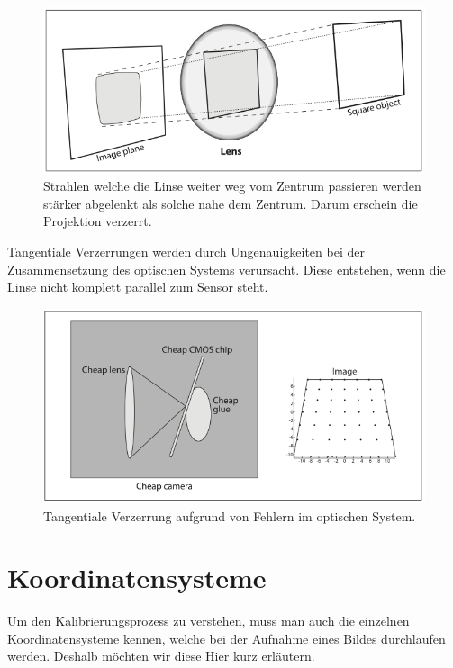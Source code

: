 \begin{figure}[!ht]
\centering
\includegraphics[scale=0.5]{images/radial-disortion.png} 
\caption{Strahlen welche die Linse weiter weg vom Zentrum passieren werden stärker abgelenkt als solche nahe dem Zentrum. Darum erschein die Projektion verzerrt.\protect\cite{learningopencv}}
\label{fig:radial-disortion}
\end{figure}

Tangentiale Verzerrungen werden durch Ungenauigkeiten bei der Zusammensetzung des optischen Systems verursacht. Diese entstehen, wenn die Linse nicht komplett parallel zum Sensor steht.

\begin{figure}[!ht]
\centering
\includegraphics[scale=0.5]{images/tangential-disortion.png} 
\caption{Tangentiale Verzerrung aufgrund von Fehlern im optischen System.\protect\cite{learningopencv}}
\label{fig:tangential-disortion}
\end{figure}

\section{Koordinatensysteme}
Um den Kalibrierungsprozess zu verstehen, muss man auch die einzelnen Koordinatensysteme kennen, welche bei der Aufnahme eines Bildes durchlaufen werden. Deshalb möchten wir diese Hier kurz erläutern.

